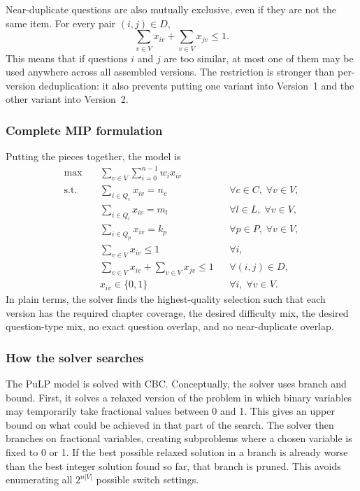 \documentclass[11pt,a4paper]{article}
\begin{document}
Near-duplicate questions are also mutually exclusive, even if they are not the
same item. For every pair $(i,j)\in D$,
\begin{equation}
  \sum_{v\in V}x_{iv}+\sum_{v\in V}x_{jv}\leq 1.
  \label{eq:deep-dup}
\end{equation}
This means that if questions $i$ and $j$ are too similar, at most one of them
may be used anywhere across all assembled versions. The restriction is stronger
than per-version deduplication: it also prevents putting one variant into
Version~1 and the other variant into Version~2.

\subsubsection{Complete MIP formulation}

Putting the pieces together, the model is
\begin{align}
\max \quad & \sum_{v\in V}\sum_{i=0}^{n-1} w_i x_{iv} \\
\text{s.t.}\quad
& \sum_{i\in Q_c}x_{iv}=n_c && \forall c\in C,\;\forall v\in V, \\
& \sum_{i\in Q_l}x_{iv}=m_l && \forall l\in L,\;\forall v\in V, \\
& \sum_{i\in Q_p}x_{iv}=k_p && \forall p\in P,\;\forall v\in V, \\
& \sum_{v\in V}x_{iv}\leq 1 && \forall i, \\
& \sum_{v\in V}x_{iv}+\sum_{v\in V}x_{jv}\leq 1 && \forall(i,j)\in D, \\
& x_{iv}\in\{0,1\} && \forall i,\;\forall v\in V.
\end{align}
In plain terms, the solver finds the highest-quality selection such that each
version has the required chapter coverage, the desired difficulty mix, the
desired question-type mix, no exact question overlap, and no near-duplicate
overlap.

\subsubsection{How the solver searches}

The PuLP model is solved with CBC. Conceptually, the solver uses branch and
bound. First, it solves a relaxed version of the problem in which binary
variables may temporarily take fractional values between 0 and 1. This gives an
upper bound on what could be achieved in that part of the search. The solver
then branches on fractional variables, creating subproblems where a chosen
variable is fixed to 0 or 1. If the best possible relaxed solution in a branch
is already worse than the best integer solution found so far, that branch is
pruned. This avoids enumerating all $2^{n|V|}$ possible switch settings.
\end{document}

